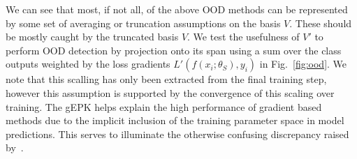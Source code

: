 We can see that most, if not all, of the above OOD methods can be
represented by some set of averaging or truncation assumptions on the
basis $V$. These should be mostly caught by the truncated basis
$V$. We test the usefulness of $V'$ to perform OOD detection by
projection onto its span using a sum over the class outputs weighted
by the loss gradients $L'(f(x_i; \theta_S), y_i)$ in
Fig.~\ref{fig:ood}. We note that this scalling has only been extracted
from the final training step, however this assumption is supported by
the convergence of this scaling over training. The gEPK helps explain the high performance of gradient based methods due to the implicit inclusion of the training parameter space in model predictions. This serves to illuminate the otherwise confusing discrepancy raised by~\citet{igoe2022}. 

\begin{figure}[t]
\begin{center}
\end{center}
\end{figure}
